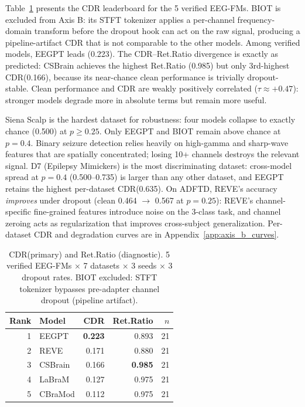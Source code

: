 \documentclass{article}
\newcommand{\cdr}{\textsc{CDR}\xspace}
\begin{document}
Table~\ref{tab:cdr} presents the \cdr leaderboard for the 5 verified EEG-FMs. BIOT is excluded from Axis B: its STFT tokenizer applies a per-channel frequency-domain transform before the dropout hook can act on the raw signal, producing a pipeline-artifact CDR that is not comparable to the other models. Among verified models, EEGPT leads (0.223). The \cdr--Ret.Ratio divergence is exactly as predicted: CSBrain achieves the highest Ret.Ratio (0.985) but only 3rd-highest \cdr (0.166), because its near-chance clean performance is trivially dropout-stable. Clean performance and \cdr are weakly positively correlated ($\tau \approx +0.47$): stronger models degrade more in absolute terms but remain more useful.

Siena Scalp is the hardest dataset for robustness: four models collapse to exactly chance (0.500) at $p \geq 0.25$. Only EEGPT and BIOT remain above chance at $p = 0.4$. Binary seizure detection relies heavily on high-gamma and sharp-wave features that are spatially concentrated; losing 10+ channels destroys the relevant signal. D7 (Epilepsy Mimickers) is the most discriminating dataset: cross-model spread at $p = 0.4$ (0.500--0.735) is larger than any other dataset, and EEGPT retains the highest per-dataset \cdr (0.635). On ADFTD, REVE's accuracy \emph{improves} under dropout (clean 0.464 $\to$ 0.567 at $p = 0.25$): REVE's channel-specific fine-grained features introduce noise on the 3-class task, and channel zeroing acts as regularization that improves cross-subject generalization. Per-dataset \cdr and degradation curves are in Appendix~\ref{app:axis_b_curves}.

\begin{table}[t]
  \caption{\cdr (primary) and Ret.Ratio (diagnostic). 5 verified EEG-FMs $\times$ 7 datasets $\times$ 3 seeds $\times$ 3 dropout rates. BIOT excluded: STFT tokenizer bypasses pre-adapter channel dropout (pipeline artifact).}
  \label{tab:cdr}
  \centering
  \small
  \begin{tabular}{rlrrr}
    \toprule
    Rank & Model & \cdr & Ret.Ratio & $n$ \\
    \midrule
    1 & EEGPT & \textbf{0.223} & 0.893 & 21 \\
    2 & REVE & 0.171 & 0.880 & 21 \\
    3 & CSBrain & 0.166 & \textbf{0.985} & 21 \\
    4 & LaBraM & 0.127 & 0.975 & 21 \\
    5 & CBraMod & 0.112 & 0.975 & 21 \\
    \bottomrule
  \end{tabular}
\end{table}
\end{document}
